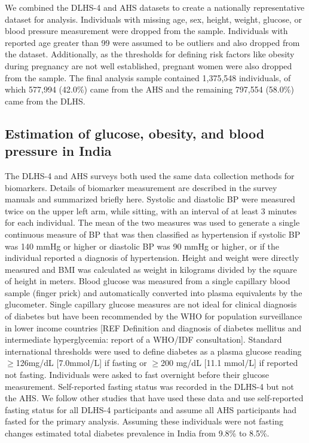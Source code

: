 \documentclass[10pt,letterpaper]{article}
\numberwithin{equation}{section}
\begin{document}
We combined the DLHS-4 and AHS datasets to create a nationally representative dataset for analysis. Individuals with missing age, sex, height, weight, glucose, or blood pressure measurement were dropped from the sample. Individuals with reported age greater than 99 were assumed to be outliers and also dropped from the dataset. Additionally, as the thresholds for defining risk factors like obesity during pregnancy are not well established, pregnant women were also dropped from the sample. The final analysis sample contained 1,375,548 individuals, of which 577,994 (42.0\%) came from the AHS and the remaining 797,554 (58.0\%) came from the DLHS.

\subsection{Estimation of glucose, obesity, and blood pressure in India}
The DLHS-4 and AHS surveys both used the same data collection methods for biomarkers. Details of biomarker measurement are described in the survey manuals and summarized briefly here.\cite{noauthor_annual_2014} Systolic and diastolic BP were measured twice on the upper left arm, while sitting, with an interval of at least 3 minutes for each individual. The mean of the two measures was used to generate a single continuous measure of BP that was then classified as hypertension if systolic BP was 140 mmHg or higher or diastolic BP was 90 mmHg or higher, or if the individual reported a diagnosis of hypertension. Height and weight were directly measured and BMI was calculated as weight in kilograms divided by the square of height in meters. Blood glucose was measured from a single capillary blood sample (finger prick) and automatically converted into plasma equivalents by the glucometer. Single capillary glucose measures are not ideal for clinical diagnosis of diabetes but have been recommended by the WHO for population surveillance in lower income countries [REF Definition and diagnosis of diabetes mellitus and intermediate hyperglycemia: report of a WHO/IDF consultation]. Standard international thresholds were used to define diabetes as a plasma glucose reading $\geq$126mg/dL [7.0mmol/L] if fasting or $\geq$200 mg/dL [11.1 mmol/L] if reported not fasting. Individuals were asked to fast overnight before their glucose measurement. Self-reported fasting status was recorded in the DLHS-4 but not the AHS. We follow other studies that have used these data and use self-reported fasting status for all DLHS-4 participants and assume all AHS participants had fasted for the primary analysis. \cite{geldsetzer_diabetes_2018,bischops_prevalence_2019} Assuming these individuals were not fasting changes estimated total diabetes prevalence in India from 9.8\% to 8.5\%.
\end{document}
